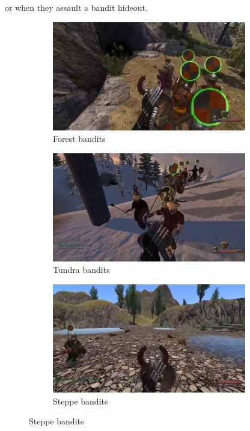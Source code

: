 \documentclass[
]{article}
\begin{document}
or when they assault a bandit hideout.



\begin{figure}[H]
	\centering
	\begin{subfigure}[b]{0.3\textwidth}
		\includegraphics[width=\linewidth]{docimages/E_0041_00_39_58.jpg}
		\caption{Forest bandits}
	\end{subfigure}
	\begin{subfigure}[b]{0.3\textwidth}
		\includegraphics[width=\linewidth]{docimages/E_0054_00_10_54.jpg}
		\caption{Tundra bandits}
	\end{subfigure}
	\begin{subfigure}[b]{0.3\textwidth}
		\includegraphics[width=\linewidth]{docimages/E_0042_00_05_08.jpg}
		\caption{Steppe bandits}
	\end{subfigure}
\end{figure}
\end{document}
